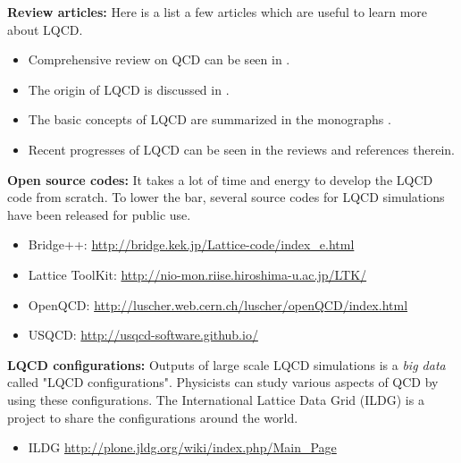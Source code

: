 \noindent
 {\bf Review articles:}   Here is a list a few articles which are useful to learn more about LQCD.  
 \begin{itemize}
\item Comprehensive review on QCD can be seen in \cite{Brambilla:2014jmp}.
\item The origin of LQCD is discussed in \cite{Wilson:2004de}.
\item The basic concepts  of LQCD are summarized in the monographs \cite{Creutz:1984mg,Rothe:1992nt}.
 \item Recent progresses of LQCD can be seen in the reviews \cite{Hoelbling:2014uea,Ukawa:2015eka} and references therein. 
 \end{itemize}

\vspace{0.3cm}

 \noindent
 {\bf Open source codes:} 
 It takes a lot of time and energy to develop the LQCD code from scratch. To lower the bar,
 several source codes for LQCD simulations have been released for public use.
  \begin{itemize}
\item Bridge++: \url{http://bridge.kek.jp/Lattice-code/index_e.html}
\item Lattice ToolKit: \url{http://nio-mon.riise.hiroshima-u.ac.jp/LTK/}
\item OpenQCD: \url{http://luscher.web.cern.ch/luscher/openQCD/index.html}
\item USQCD: \url{http://usqcd-software.github.io/}
\end{itemize}

\vspace{0.3cm}
 \noindent
{\bf LQCD configurations:}  Outputs of large scale LQCD simulations  is a {\it big data}  
called "LQCD configurations".   Physicists can study various aspects of QCD by using these configurations.
 The International Lattice Data Grid (ILDG) is a project to share the configurations around the world.
  \begin{itemize}
 \item ILDG \url{http://plone.jldg.org/wiki/index.php/Main_Page}
\end{itemize}
 
